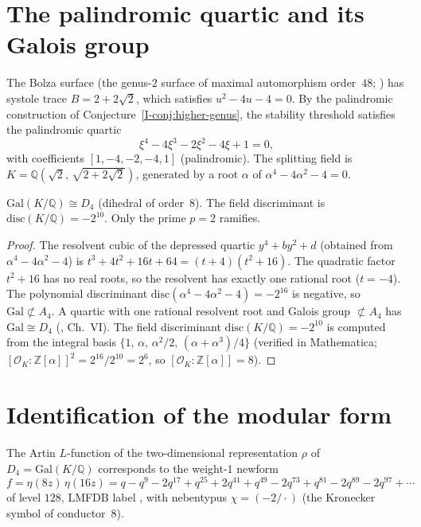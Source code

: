 \section{The palindromic quartic and its Galois group}

The Bolza surface (the genus-$2$ surface of maximal automorphism
order~$48$; \citealt{Buser1992}) has systole trace
$B = 2 + 2\sqrt{2}$, which satisfies $u^2 - 4u - 4 = 0$.
By the palindromic construction of
Conjecture~\ref{I-conj:higher-genus}, the stability threshold
satisfies the palindromic quartic
\begin{equation}\label{eq:bolza-quartic}
  \xi^4 - 4\xi^3 - 2\xi^2 - 4\xi + 1 = 0,
\end{equation}
with coefficients $[1, -4, -2, -4, 1]$ (palindromic).
The splitting field is $K = \mathbb{Q}(\sqrt{2},\,
\sqrt{2{+}2\sqrt{2}})$, generated by a root $\alpha$
of $\alpha^4 - 4\alpha^2 - 4 = 0$.

\begin{proposition}
\label{prop:bolza-galois}
$\mathrm{Gal}(K/\mathbb{Q}) \cong D_4$ (dihedral of order~$8$).
The field discriminant is $\mathrm{disc}(K/\mathbb{Q}) = -2^{10}$.
Only the prime $p = 2$ ramifies.
\end{proposition}

\begin{proof}
The resolvent cubic of the depressed quartic $y^4 + by^2 + d$
(obtained from $\alpha^4 - 4\alpha^2 - 4$) is
$t^3 + 4t^2 + 16t + 64 = (t{+}4)(t^2 + 16)$.
The quadratic factor $t^2 + 16$ has no real roots,
so the resolvent has exactly one rational root ($t = -4$).
The polynomial discriminant
$\mathrm{disc}(\alpha^4 - 4\alpha^2 - 4) = -2^{16}$ is
negative, so $\mathrm{Gal} \not\subset A_4$.
A quartic with one rational resolvent root and Galois group
$\not\subset A_4$ has $\mathrm{Gal} \cong D_4$
(\citealt{Lang2002}, Ch.~VI).
The field discriminant $\mathrm{disc}(K/\mathbb{Q}) = -2^{10}$
is computed from the integral basis
$\{1,\, \alpha,\, \alpha^2/2,\, (\alpha + \alpha^3)/4\}$
(verified in Mathematica;
$[\mathcal{O}_K : \mathbb{Z}[\alpha]]^2
= 2^{16}/2^{10} = 2^6$, so $[\mathcal{O}_K : \mathbb{Z}[\alpha]] = 8$).
\end{proof}

\section{Identification of the modular form}

\begin{theorem}
\label{thm:bolza-modular}
The Artin $L$-function of the two-dimensional representation
$\rho$ of $D_4 = \mathrm{Gal}(K/\mathbb{Q})$ corresponds to
the weight-$1$ newform
\[
  f = \eta(8z)\,\eta(16z)
  = q - q^9 - 2q^{17} + q^{25} + 2q^{41} + q^{49}
    - 2q^{73} + q^{81} - 2q^{89} - 2q^{97} + \cdots
\]
of level $128$, LMFDB label ,
with nebentypus $\chi = (-2/\cdot)$
(the Kronecker symbol of conductor~$8$).
\end{theorem}

